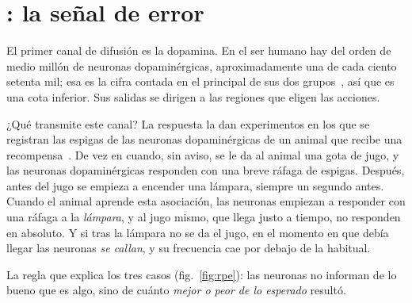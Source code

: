 \section{: la señal de error}

El primer canal de difusión es la dopamina. En el ser humano hay del orden de medio millón de neuronas dopaminérgicas, aproximadamente una de cada ciento setenta mil; esa es la cifra contada en el principal de sus dos grupos~\cite{Pakkenberg1991}, así que es una cota inferior. Sus salidas se dirigen a las regiones que eligen las acciones.

¿Qué transmite este canal? La respuesta la dan experimentos en los que se registran las espigas de las neuronas dopaminérgicas de un animal que recibe una recompensa~\cite{Schultz1997}. De vez en cuando, sin aviso, se le da al animal una gota de jugo, y las neuronas dopaminérgicas responden con una breve ráfaga de espigas. Después, antes del jugo se empieza a encender una lámpara, siempre un segundo antes. Cuando el animal aprende esta asociación, las neuronas empiezan a responder con una ráfaga a la \emph{lámpara}, y al jugo mismo, que llega justo a tiempo, no responden en absoluto. Y si tras la lámpara no se da el jugo, en el momento en que debía llegar las neuronas \emph{se callan}, y su frecuencia cae por debajo de la habitual.

La regla que explica los tres casos (fig.~\ref{fig:rpe}): las neuronas no informan de lo bueno que es algo, sino de cuánto \emph{mejor o peor de lo esperado} resultó.

